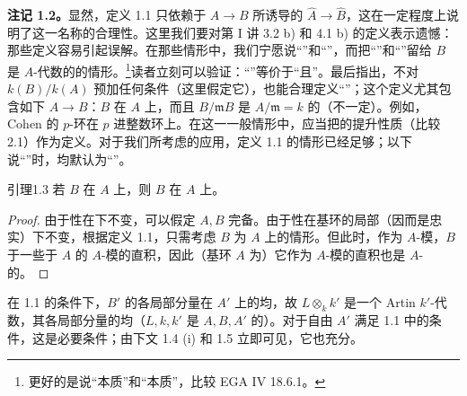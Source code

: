 \textbf{注记 1.2。}显然，定义 1.1 只依赖于 $A\to B$ 所诱导的 $\widehat A\to\widehat B$，这在一定程度上说明了这一名称的合理性。这里我们要对第 I 讲 3.2 b) 和 4.1 b) 的定义表示遗憾：那些定义容易引起误解。在那些情形中，我们宁愿说“”和“”，而把“”和“”留给 $B$ 是 $A$-代数的的情形。\footnote{更好的是说“本质”和“本质”，比较 EGA IV 18.6.1。}读者立刻可以验证：“”等价于“且”。最后指出，不对 $k(B)/k(A)$ 预加任何条件（这里假定它），也能合理定义“”；这个定义尤其包含如下 $A\to B$：$B$ 在 $A$ 上，而且 $B/\mathfrak mB$ 是 $A/\mathfrak m=k$ 的（不一定）。例如，Cohen 的 $p$-环在 $p$ 进整数环上。在这一一般情形中，应当把的提升性质（比较 2.1）作为定义。对于我们所考虑的应用，定义 1.1 的情形已经足够；以下说“”时，均默认为“”。
\begin{SGAresult}{引理}{1.3}
若 $B$ 在 $A$ 上，则 $B$ 在 $A$ 上。
\end{SGAresult}
\begin{proof}
由于性在下不变，可以假定 $A,B$ 完备。由于性在基环的局部（因而是忠实）下不变，根据定义 1.1，只需考虑 $B$ 为 $A$ 上的情形。但此时，作为 $A$-模，$B$ 于一些于 $A$ 的 $A$-模的直积，因此（基环 $A$ 为）它作为 $A$-模的直积也是 $A$-的。
\end{proof}
在 1.1 的条件下，$B'$ 的各局部分量在 $A'$ 上的均，故 $L\otimes_k k'$ 是一个 Artin $k'$-代数，其各局部分量的均（$L,k,k'$ 是 $A,B,A'$ 的）。对于自由 $A'$ 满足 1.1 中的条件，这是必要条件；由下文 1.4 (i) 和 1.5 立即可见，它也充分。
